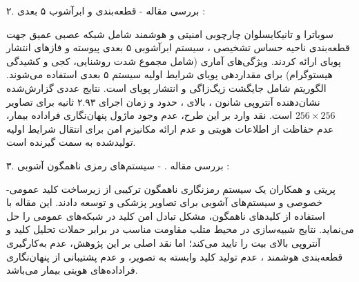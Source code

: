۲. بررسی مقاله   {-} قطعه‌بندی  و ابرآشوب ۵ بعدی :\par

سوباترا و تانیکایسلوان چارچوبی امنیتی و هوشمند شامل شبکه عصبی عمیق  جهت قطعه‌بندی ناحیه حساس تشخیصی ، سیستم ابرآشوبی ۵ بعدی پیوسته و فازهای انتشار پویای  ارائه کردند. ویژگی‌های آماری  (شامل مجموع شدت روشنایی، کجی و کشیدگی هیستوگرام) برای مقداردهی پویای شرایط اولیه سیستم ۵ بعدی استفاده می‌شوند. الگوریتم شامل جایگشت زیگ‌زاگی و انتشار پویای   است. نتایج عددی گزارش‌شده نشان‌دهنده آنتروپی شانون ،  بالای ،  حدود  و زمان اجرای ۲.۹۳ ثانیه برای تصاویر $256 \times 256$ است. نقد وارد بر این طرح، عدم وجود ماژول پنهان‌نگاری فراداده بیمار، عدم حفاظت از اطلاعات هویتی و عدم ارائه مکانیزم امن برای انتقال شرایط اولیه تولیدشده به سمت گیرنده است.\par



۳. بررسی مقاله .  {-} سیستم‌های رمزی ناهمگون آشوبی :\par

پریتی و همکاران یک سیستم رمزنگاری ناهمگون  ترکیبی از زیرساخت کلید عمومی{-}خصوصی  و سیستم‌های آشوبی برای تصاویر پزشکی  و  توسعه دادند. این مقاله با استفاده از کلیدهای ناهمگون، مشکل تبادل امن کلید در شبکه‌های عمومی را حل می‌نماید. نتایج شبیه‌سازی در محیط متلب مقاومت مناسب در برابر حملات تحلیل کلید و آنتروپی بالای  بیت را تایید می‌کند؛ اما نقد اصلی بر این پژوهش، عدم به‌کارگیری قطعه‌بندی هوشمند ، عدم تولید کلید وابسته به تصویر، و عدم پشتیبانی از پنهان‌نگاری فراداده‌های هویتی بیمار می‌باشد.\par






